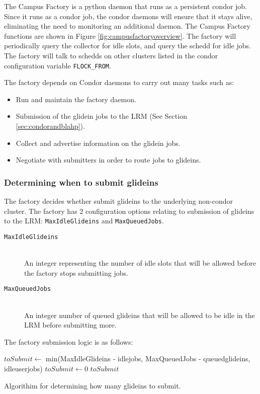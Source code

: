 \documentclass[11pt]{article}
\begin{document}
The Campus Factory is a python daemon that runs as a persistent condor job.  Since it runs as a condor job, the condor daemons will ensure that it stays alive, eliminating the need to monitoring an additional daemon.  The Campus Factory functions are shown in Figure \ref{fig:campusfactoryoverview}.  The factory will periodically query the collector for idle slots, and query the schedd for idle jobs.  The factory will talk to schedds on other clusters listed in the condor configuration variable \texttt{FLOCK\_FROM}.

The factory depends on Condor daemons to carry out many tasks such as:
\begin{itemize}
\item Run and maintain the factory daemon.
\item Submission of the glidein jobs to the LRM (See Section \ref{sec:condorandblahp}).
\item Collect and advertise information on the glidein jobs.
\item Negotiate with submitters in order to route jobs to glideins.
\end{itemize}


\subsubsection{Determining when to submit glideins}
The factory decides whether submit glideins to the underlying non-condor cluster.  The factory has 2 configuration options relating to submission of glideins to the LRM: \texttt{MaxIdleGlideins} and \texttt{MaxQueuedJobs}.

\begin{description}
\item[ \texttt{MaxIdleGlideins}] \hfill \\
An integer representing the number of idle slots that will be allowed before the factory stops submitting jobs. 

\item[ \texttt{MaxQueuedJobs}] \hfill \\
An integer number of queued glideins that will be allowed to be idle in the LRM before submitting more. 

\end{description}

The factory submission logic is as follows:

\begin{algorithm}
\begin{algorithmic}
	\STATE $toSubmit \gets$ min(MaxIdleGlideins - idlejobs, MaxQueuedJobs - queuedglideins, idleuserjobs)
\ELSE
	\STATE $toSubmit \gets 0$
\ENDIF
\RETURN $toSubmit$

\end{algorithmic}
\caption{Algorithim for determining how many glideins to submit.}
\end{algorithm}
\end{document}
